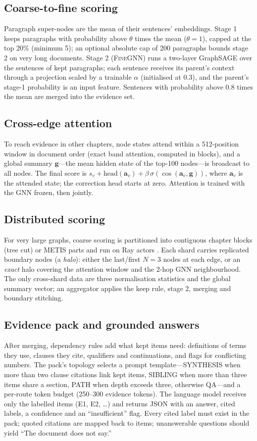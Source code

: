 \documentclass[11pt]{article}
\newcommand{\fine}{\textsc{FineGNN}}
\begin{document}
\subsection{Coarse-to-fine scoring}
Paragraph super-nodes are the mean of their sentences' embeddings. Stage 1 keeps paragraphs with probability above $\theta$ times the mean ($\theta{=}1$), capped at the top 20\% (minimum 5); an optional absolute cap of 200 paragraphs bounds stage 2 on very long documents. Stage 2 (\fine{}) runs a two-layer GraphSAGE over the sentences of kept paragraphs; each sentence receives its parent's context through a projection scaled by a trainable $\alpha$ (initialised at 0.3), and the parent's stage-1 probability is an input feature. Sentences with probability above 0.8 times the mean are merged into the evidence set.

\subsection{Cross-edge attention}
To reach evidence in other chapters, node states attend within a 512-position window in document order (exact band attention, computed in blocks), and a global summary $\mathbf{g}$---the mean hidden state of the top-100 nodes---is broadcast to all nodes. The final score is $s_v + \mathrm{head}(\mathbf{a}_v) + \beta\,\sigma(\cos(\mathbf{a}_v,\mathbf{g}))$, where $\mathbf{a}_v$ is the attended state; the correction head starts at zero. Attention is trained with the GNN frozen, then jointly.

\subsection{Distributed scoring}
For very large graphs, coarse scoring is partitioned into contiguous chapter blocks (tree cut) or METIS parts \citep{karypis1998metis} and run on Ray actors \citep{moritz2018ray}. Each shard carries replicated boundary nodes (a \emph{halo}): either the last/first $N{=}3$ nodes at each edge, or an \emph{exact} halo covering the attention window and the 2-hop GNN neighbourhood. The only cross-shard data are three normalisation statistics and the global summary vector; an aggregator applies the keep rule, stage 2, merging and boundary stitching.

\subsection{Evidence pack and grounded answers}
After merging, dependency rules add what kept items need: definitions of terms they use, clauses they cite, qualifiers and continuations, and flags for conflicting numbers. The pack's topology selects a prompt template---SYNTHESIS when more than two clause citations link kept items, SIBLING when more than three items share a section, PATH when depth exceeds three, otherwise QA---and a per-route token budget (250--300 evidence tokens). The language model receives only the labelled items (E1, E2, \dots) and returns JSON with an answer, cited labels, a confidence and an ``insufficient'' flag. Every cited label must exist in the pack; quoted citations are mapped back to items; unanswerable questions should yield ``The document does not say.''
\end{document}
